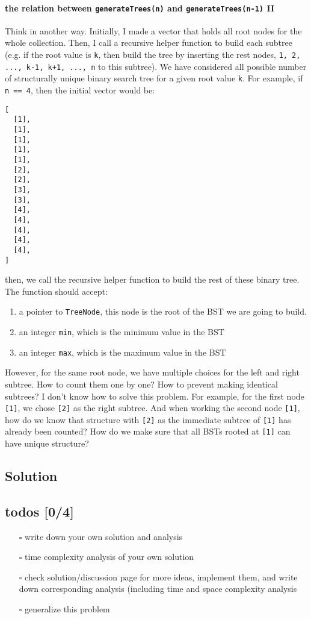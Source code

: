 \documentclass[12pt]{article}
\begin{document}
\paragraph{the relation between \texttt{generateTrees(n)} and \texttt{generateTrees(n-1)} II}
\label{sec:orgcc5e9a7}

Think in another way. Initially, I made a vector that holds all root nodes for the whole collection. Then, I call a recursive helper function to build each subtree (e.g. if the root value is \texttt{k}, then build the tree by inserting the rest nodes, \texttt{1, 2, ..., k-1, k+1, ..., n} to this subtree). We have considered all possible number of structurally unique binary search tree for a given root value \texttt{k}. For example, if \texttt{n == 4}, then the initial vector would be:
\begin{verbatim}
[
  [1],
  [1],
  [1],
  [1],
  [1],
  [2],
  [2],
  [3],
  [3],
  [4],
  [4],
  [4],
  [4],
  [4],
]
\end{verbatim}
then, we call the recursive helper function to build the rest of these binary tree. The function should accept:
\begin{enumerate}
\item a pointer to \texttt{TreeNode}, this node is the root of the BST we are going to build.
\item an integer \texttt{min}, which is the minimum value in the BST
\item an integer \texttt{max}, which is the maximum value in the BST
\end{enumerate}

However, for the same root node, we have multiple choices for the left and right subtree. How to count them one by one? How to prevent making identical subtrees? I don't know how to solve this problem. For example, for the first node \texttt{[1]}, we chose \texttt{[2]} as the right subtree. And when working the second node \texttt{[1]}, how do we know that structure with \texttt{[2]} as the immediate subtree of \texttt{[1]} has already been counted? How do we make sure that all BSTs rooted at \texttt{[1]} can have unique structure?
\subsection{Solution}
\label{sec:org5c5e48e}

\subsection{todos [0/4]}
\label{sec:orgec79d79}
\begin{itemize}
\item[{$\square$}] write down your own solution and analysis
\item[{$\square$}] time complexity analysis of your own solution
\item[{$\square$}] check solution/discussion page for more ideas, implement them, and write down corresponding analysis (including time and space complexity analysis
\item[{$\square$}] generalize this problem
\end{itemize}
\end{document}
